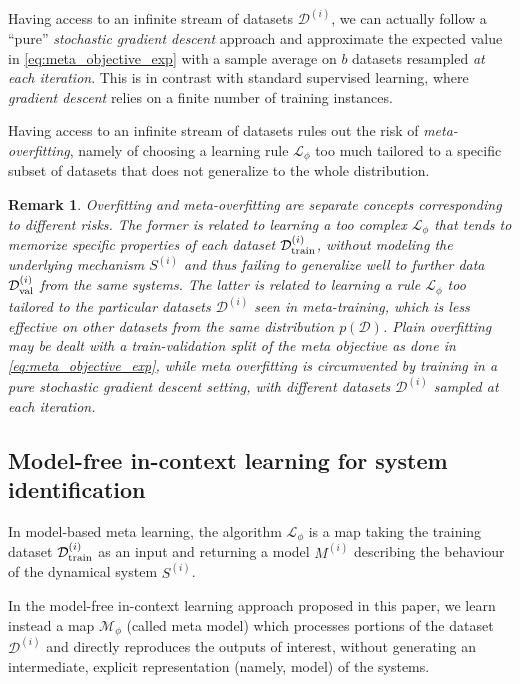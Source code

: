 \documentclass{article}
\newcommand{\sys}{S}
\newcommand{\learn}{\mathcal{L}}
\newcommand{\free}{\mathcal{M}}
\newcommand{\D}{\mathcal{D}}
\newtheorem{remark}{Remark}%
\begin{document}
Having access to an infinite stream of datasets $\D^{(i)}$, we can actually follow a ``pure'' \emph{stochastic gradient descent} approach and approximate the expected value in \eqref{eq:meta_objective_exp} with a sample average on $b$ datasets resampled \emph{at each iteration}. This is in contrast with standard supervised learning, where \emph{gradient descent} relies on a finite number of training instances. 

Having access to an infinite stream of datasets rules out the risk of \emph{meta-overfitting}, namely of choosing a learning rule $\learn_\phi$ too much tailored to a specific 
subset of datasets that does not generalize to the whole distribution.
 
\begin{remark}
Overfitting and meta-overfitting are separate concepts corresponding to different risks. The former is related to learning a too complex $\learn_\phi$ that tends to memorize specific properties of each dataset $\D^{(i)}_{\rm train}$, without modeling the underlying mechanism $\sys^{(i)}$ and thus failing to generalize well to further data $\D^{(i)}_{\rm val}$ from the same systems.
The latter is related to learning a rule $\learn_\phi$ too tailored to the particular datasets $\D^{(i)}$ seen in meta-training, which is less effective on other datasets from the same distribution $p(\D)$. 
Plain overfitting  may be dealt with a train-validation split of the meta objective as done in \eqref{eq:meta_objective_exp}, while meta overfitting is circumvented by training in a pure stochastic gradient descent setting, with different datasets $\D^{(i)}$ sampled at each iteration. 
\end{remark}






\subsection{Model-free in-context learning for system identification}
\label{sec:model_free_model_based}
In model-based meta learning, the algorithm $\learn_\phi$ is a map taking the training dataset $\D^{(i)}_{\rm train}$ as an input and returning  a model $M^{(i)}$ describing the behaviour of the dynamical  system $\sys^{(i)}$. 
%  


In the model-free in-context  learning approach proposed in this paper, we learn instead a map $\free_{\phi}$ (called meta model) which processes  portions of the dataset $\D^{(i)}$ and directly reproduces the outputs  of interest, without generating an intermediate, explicit representation (namely, model) of the systems. 
%
\end{document}
